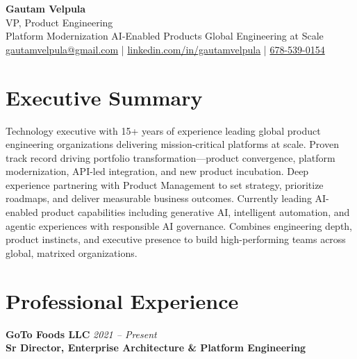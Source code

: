 \documentclass[11pt]{article}
\begin{document}
\begin{center}
    {\LARGE \textbf{Gautam Velpula}} \\[4pt]
    VP, Product Engineering \\[6pt]
    Platform Modernization \textbullet{} AI-Enabled Products \textbullet{} Global Engineering at Scale \\[6pt]
    \href{mailto:gautamvelpula@gmail.com}{gautamvelpula@gmail.com} \;|\;
    \href{https://www.linkedin.com/in/gautamvelpula}{linkedin.com/in/gautamvelpula} \;|\;
    \href{tel:6785390154}{678-539-0154}
  \end{center}

\vspace{8pt}

\section*{Executive Summary}
Technology executive with 15+ years of experience leading global product engineering organizations delivering mission-critical platforms at scale. Proven track record driving portfolio transformation---product convergence, platform modernization, API-led integration, and new product incubation. Deep experience partnering with Product Management to set strategy, prioritize roadmaps, and deliver measurable business outcomes. Currently leading AI-enabled product capabilities including generative AI, intelligent automation, and agentic experiences with responsible AI governance. Combines engineering depth, product instincts, and executive presence to build high-performing teams across global, matrixed organizations.

\section*{Professional Experience}

\textbf{GoTo Foods LLC} \hfill \textit{2021 -- Present} \\
\textbf{Sr Director, Enterprise Architecture \& Platform Engineering}
\end{document}
